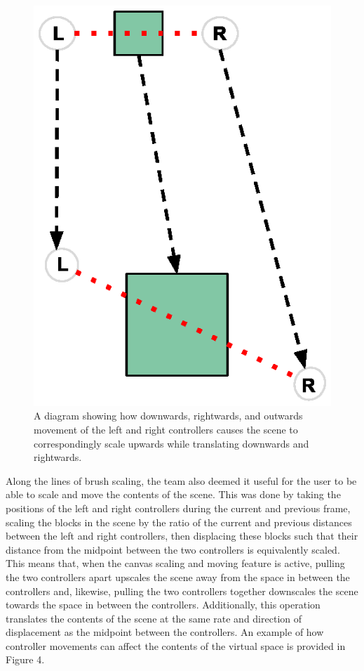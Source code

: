 \documentclass[onecolumn, draftclsnofoot,10pt, compsoc]{IEEEtran}
\begin{document}
\begin{figure}[h]
\centering
\includegraphics{Scaling.eps}
\caption{A diagram showing how downwards, rightwards, and outwards movement of the left and right controllers causes the scene to correspondingly scale upwards while translating downwards and rightwards.}
\end{figure}


Along the lines of brush scaling, the team also deemed it useful for the user to be able to scale and move the contents of the scene. This was done by taking the positions of the left and right controllers during the current and previous frame, scaling the blocks in the scene by the ratio of the current and previous distances between the left and right controllers, then displacing these blocks such that their distance from the midpoint between the two controllers is equivalently scaled. This means that, when the canvas scaling and moving feature is active, pulling the two controllers apart upscales the scene away from the space in between the controllers and, likewise, pulling the two controllers together downscales the scene towards the space in between the controllers. Additionally, this operation translates the contents of the scene at the same rate and direction of displacement as the midpoint between the controllers. An example of how controller movements can affect the contents of the virtual space is provided in Figure 4.
\end{document}
